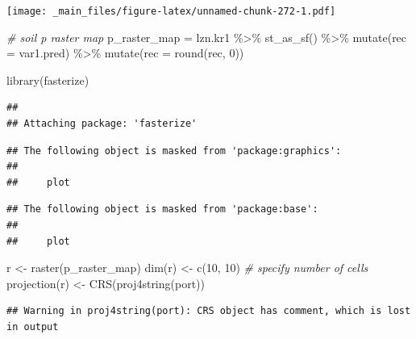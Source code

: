\documentclass[
]{book}
\newenvironment{Shaded}{\begin{snugshade}}{\end{snugshade}}
\newcommand{\AttributeTok}[1]{\textcolor[rgb]{0.77,0.63,0.00}{#1}}
\newcommand{\CommentTok}[1]{\textcolor[rgb]{0.56,0.35,0.01}{\textit{#1}}}
\newcommand{\DecValTok}[1]{\textcolor[rgb]{0.00,0.00,0.81}{#1}}
\newcommand{\FunctionTok}[1]{\textcolor[rgb]{0.00,0.00,0.00}{#1}}
\newcommand{\NormalTok}[1]{#1}
\newcommand{\OtherTok}[1]{\textcolor[rgb]{0.56,0.35,0.01}{#1}}
\newcommand{\SpecialCharTok}[1]{\textcolor[rgb]{0.00,0.00,0.00}{#1}}
\begin{document}
\texttt{[image: \_main\_files/figure-latex/unnamed-chunk-272-1.pdf]}

\begin{Shaded}
\begin{Highlighting}[]
\CommentTok{\# soil p raster map}
\NormalTok{p\_raster\_map }\OtherTok{=}\NormalTok{ lzn.kr1 }\SpecialCharTok{\%\textgreater{}\%}
  \FunctionTok{st\_as\_sf}\NormalTok{() }\SpecialCharTok{\%\textgreater{}\%}
  \FunctionTok{mutate}\NormalTok{(}\AttributeTok{rec =}\NormalTok{ var1.pred) }\SpecialCharTok{\%\textgreater{}\%}
  \FunctionTok{mutate}\NormalTok{(}\AttributeTok{rec =} \FunctionTok{round}\NormalTok{(rec, }\DecValTok{0}\NormalTok{))}

\FunctionTok{library}\NormalTok{(fasterize)}
\end{Highlighting}
\end{Shaded}

\begin{verbatim}
## 
## Attaching package: 'fasterize'
\end{verbatim}

\begin{verbatim}
## The following object is masked from 'package:graphics':
## 
##     plot
\end{verbatim}

\begin{verbatim}
## The following object is masked from 'package:base':
## 
##     plot
\end{verbatim}

\begin{Shaded}
\begin{Highlighting}[]
\NormalTok{r }\OtherTok{\textless{}{-}} \FunctionTok{raster}\NormalTok{(p\_raster\_map)}
\FunctionTok{dim}\NormalTok{(r) }\OtherTok{\textless{}{-}} \FunctionTok{c}\NormalTok{(}\DecValTok{10}\NormalTok{, }\DecValTok{10}\NormalTok{)                      }\CommentTok{\# specify number of cells}
\FunctionTok{projection}\NormalTok{(r) }\OtherTok{\textless{}{-}} \FunctionTok{CRS}\NormalTok{(}\FunctionTok{proj4string}\NormalTok{(port))}
\end{Highlighting}
\end{Shaded}

\begin{verbatim}
## Warning in proj4string(port): CRS object has comment, which is lost in output
\end{verbatim}
\end{document}
